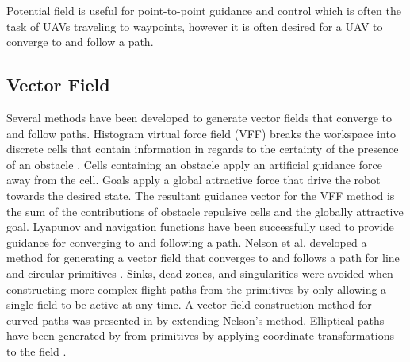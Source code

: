 \documentclass[numbered,pdftex]{ohio-etd}
\begin{document}
Potential field is useful for point-to-point guidance and control which is often the task of UAVs traveling to waypoints, however it is often desired for a UAV to converge to and follow a path. 

%
%
%

\subsection{Vector Field}

%
%
%
%
% 

Several methods have been developed to generate vector fields that converge to and follow paths. Histogram virtual force field (VFF) breaks the workspace into discrete cells that contain information in regards to the certainty of the presence of an obstacle \cite{borenstein_real-time_1990} \cite{borenstein_vector_1991}. Cells containing an obstacle apply an artificial guidance force away from the cell. Goals apply a global attractive force that drive the robot towards the desired state. The resultant guidance vector for the VFF method is the sum of the contributions of obstacle repulsive cells and the globally attractive goal. Lyapunov and navigation functions have been successfully used to provide guidance for converging to and following a path. Nelson et al. developed a method for generating a vector field that converges to and follows a path for line and circular primitives \cite{nelson_cooperative_2005}. Sinks, dead zones, and singularities were avoided when constructing more complex flight paths from the primitives by only allowing a single field to be active at any time. A vector field construction method for curved paths was presented in \cite{griffiths_vector_2006} by extending Nelson's method. Elliptical paths have been generated by from primitives by applying coordinate transformations to the field \cite{frew_lyapunov_nodate}.
\end{document}
